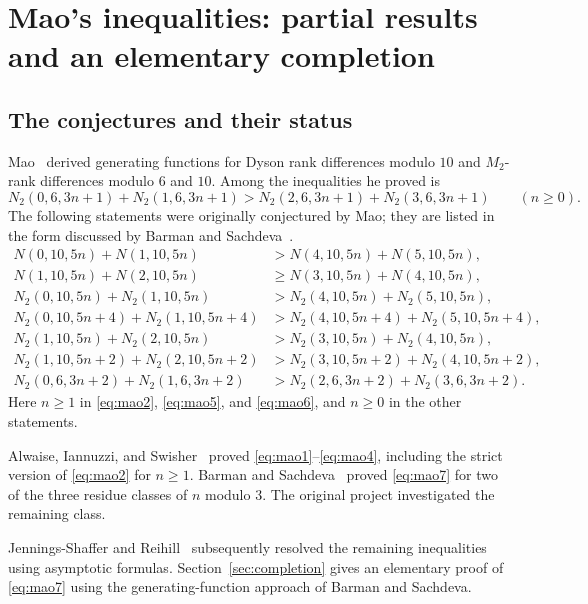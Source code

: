 \chapter{Mao's inequalities: partial results and an elementary completion}
\label{ch:mao}
\section{The conjectures and their status}
Mao~\cite{mao1,mao2} derived generating functions for Dyson rank differences
modulo $10$ and $M_2$-rank differences modulo $6$ and $10$. Among the
inequalities he proved is
\[
 N_2(0,6,3n+1)+N_2(1,6,3n+1)
 >N_2(2,6,3n+1)+N_2(3,6,3n+1)\qquad(n\ge0).
\]
The following statements were originally conjectured by Mao; they are
listed in the form discussed by Barman and Sachdeva~\cite{barman}.
\begin{align}
 N(0,10,5n)+N(1,10,5n)
 &>N(4,10,5n)+N(5,10,5n),\label{eq:mao1}\\
 N(1,10,5n)+N(2,10,5n)
 &\ge N(3,10,5n)+N(4,10,5n),\label{eq:mao2}\\
 N_2(0,10,5n)+N_2(1,10,5n)
 &>N_2(4,10,5n)+N_2(5,10,5n),\label{eq:mao3}\\
 N_2(0,10,5n+4)+N_2(1,10,5n+4)
 &>N_2(4,10,5n+4)+N_2(5,10,5n+4),\label{eq:mao4}\\
 N_2(1,10,5n)+N_2(2,10,5n)
 &>N_2(3,10,5n)+N_2(4,10,5n),\label{eq:mao5}\\
 N_2(1,10,5n+2)+N_2(2,10,5n+2)
 &>N_2(3,10,5n+2)+N_2(4,10,5n+2),\label{eq:mao6}\\
 N_2(0,6,3n+2)+N_2(1,6,3n+2)
 &>N_2(2,6,3n+2)+N_2(3,6,3n+2).\label{eq:mao7}
\end{align}
Here $n\ge1$ in \eqref{eq:mao2}, \eqref{eq:mao5}, and \eqref{eq:mao6},
and $n\ge0$ in the other statements.

Alwaise, Iannuzzi, and Swisher~\cite{atkin1} proved
\eqref{eq:mao1}--\eqref{eq:mao4}, including the strict version of
\eqref{eq:mao2} for $n\ge1$. Barman and Sachdeva~\cite{barman} proved
\eqref{eq:mao7} for two of the three residue classes of $n$ modulo $3$.
The original project investigated the remaining class.

Jennings-Shaffer and Reihill~\cite{jennings} subsequently resolved the
remaining inequalities using asymptotic formulas. Section~\ref{sec:completion}
gives an elementary proof of \eqref{eq:mao7} using the generating-function
approach of Barman and Sachdeva.

